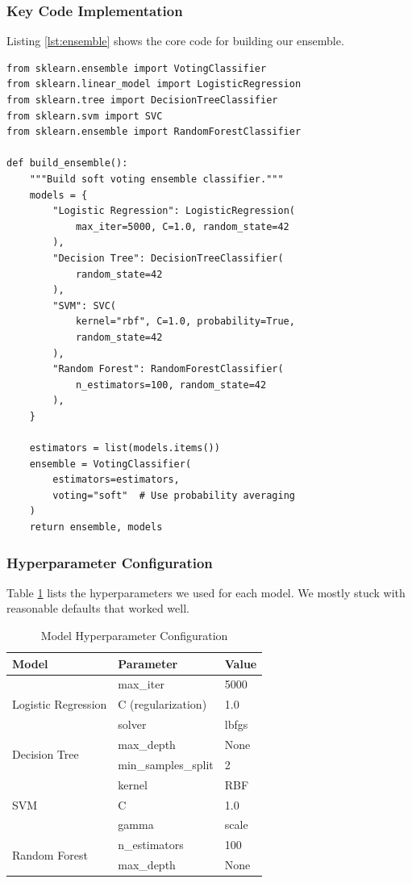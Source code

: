 \documentclass[12pt]{article}
\begin{document}
\subsubsection{Key Code Implementation}

Listing \ref{lst:ensemble} shows the core code for building our ensemble.

\begin{lstlisting}[style=pythonstyle, caption={Ensemble Model Implementation}, label={lst:ensemble}]
from sklearn.ensemble import VotingClassifier
from sklearn.linear_model import LogisticRegression
from sklearn.tree import DecisionTreeClassifier
from sklearn.svm import SVC
from sklearn.ensemble import RandomForestClassifier

def build_ensemble():
    """Build soft voting ensemble classifier."""
    models = {
        "Logistic Regression": LogisticRegression(
            max_iter=5000, C=1.0, random_state=42
        ),
        "Decision Tree": DecisionTreeClassifier(
            random_state=42
        ),
        "SVM": SVC(
            kernel="rbf", C=1.0, probability=True, 
            random_state=42
        ),
        "Random Forest": RandomForestClassifier(
            n_estimators=100, random_state=42
        ),
    }
    
    estimators = list(models.items())
    ensemble = VotingClassifier(
        estimators=estimators,
        voting="soft"  # Use probability averaging
    )
    return ensemble, models
\end{lstlisting}

\subsubsection{Hyperparameter Configuration}

Table \ref{tab:hyperparams} lists the hyperparameters we used for each model. We mostly stuck with reasonable defaults that worked well.

\begin{table}[H]
\centering
\caption{Model Hyperparameter Configuration}
\label{tab:hyperparams}
\begin{tabular}{|l|l|l|}
\hline
\textbf{Model} & \textbf{Parameter} & \textbf{Value} \\ \hline
\multirow{3}{*}{Logistic Regression} & max\_iter & 5000 \\ \cline{2-3}
 & C (regularization) & 1.0 \\ \cline{2-3}
 & solver & lbfgs \\ \hline
\multirow{2}{*}{Decision Tree} & max\_depth & None \\ \cline{2-3}
 & min\_samples\_split & 2 \\ \hline
\multirow{3}{*}{SVM} & kernel & RBF \\ \cline{2-3}
 & C & 1.0 \\ \cline{2-3}
 & gamma & scale \\ \hline
\multirow{2}{*}{Random Forest} & n\_estimators & 100 \\ \cline{2-3}
 & max\_depth & None \\ \hline
\end{tabular}
\end{table}
\end{document}
